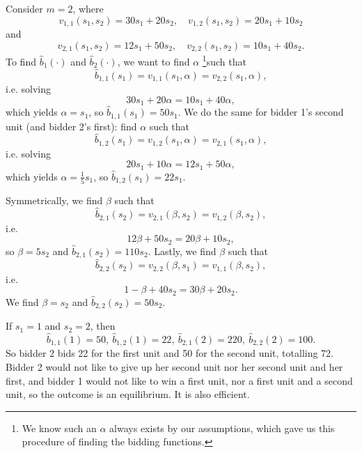\begin{example}
	Consider $m=2$, where \[
		v_{1,1}(s_1,s_2) = 30s_1 + 20s_2,\quad v_{1,2}(s_1,s_2) = 20s_1 + 10s_2
	\] and \[
		v_{2,1}(s_1,s_2) = 12s_1 + 50s_2, \quad v_{2,2}(s_1,s_2) = 10s_1 + 40s_2
	.\] To find $\hat{b}_1(\cdot )$ and $\hat{b}_2(\cdot )$, we want to find $\alpha$ \footnote{We know such an $\alpha$ always exists by our assumptions, which gave us this procedure of finding the bidding functions.}such that \[
		\hat{b}_{1,1} (s_1) = v_{1,1}(s_1, \alpha) = v_{2,2}(s_1,\alpha)
	,\] i.e. solving \[
		30s_1 + 20\alpha = 10s_1 + 40\alpha
	,\] which yields $\alpha = s_1$, so $\hat{b}_{1,1}(s_1) = 50s_1$.
	We do the same for bidder 1's second unit (and bidder 2's first): find $\alpha$ such that \[
		\hat{b}_{1,2}(s_1) = v_{1,2}(s_1,\alpha) = v_{2,1}(s_1,\alpha)
	,\] i.e. solving \[
		20s_1 + 10 \alpha = 12 s_1 + 50\alpha
	,\] which yields $\alpha = \frac{1}{5}s_1$, so $\hat{b}_{1,2}(s_1) = 22s_1$.

	Symmetrically, we find $\beta$ such that \[
		\hat{b}_{2,1}(s_2) = v_{2,1}(\beta, s_2) = v_{1,2}(\beta, s_2)
	,\] i.e. \[
		12\beta + 50s_2 = 20\beta + 10s_2
	,\] so $\beta= 5s_2$ and $\hat{b}_{2,1}(s_2) = 110s_2$. Lastly, we find $\beta$ such that \[
		\hat{b}_{2,2}(s_2) = v_{2,2}(\beta, s_1) = v_{1,1}(\beta, s_2)
	,\] i.e. \[
		1-\beta + 40s_2 = 30\beta + 20s_2
	.\] We find $\beta = s_2$ and $\hat{b}_{2,2}(s_2) = 50s_2$.


	If $s_1=  1$ and $s_2=2$, then \[
		\hat{b}_{1,1}(1) = 50, \ \hat{b}_{1,2}(1) = 22,\ \hat{b}_{2,1}(2) = 220,\ \hat{b}_{2,2}(2) = 100
	.\] So bidder $2$ bids 22 for the first unit and 50 for the second unit, totalling 72. Bidder 2 would not like to give up her second unit nor her second unit and her first, and bidder 1 would not like to win a first unit, nor a first unit and a second unit, so the outcome is an equilibrium. It is also efficient.
\end{example}
